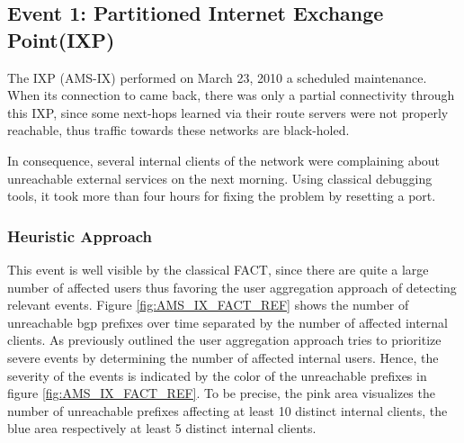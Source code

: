 \subsection{Event 1: Partitioned Internet Exchange Point(IXP)}

The IXP \citet{AMS-IX}(AMS-IX) performed on March 23, 2010 a scheduled maintenance. 
When its connection to \citet{switch} came back, there was only a partial connectivity through this IXP, since some next-hops learned via their route servers were not properly reachable, thus traffic towards these networks are black-holed\citep{SchatzmannPAM2011}.

In consequence, several internal clients of the \citet{switch} network were complaining about unreachable external services on the next morning. 
Using classical debugging tools, it took more than four hours for fixing the problem by resetting a port.\citep{SchatzmannPAM2011}

\subsubsection{Heuristic Approach} This event is well visible by the classical \gls{FACT}, since there are quite a large number of affected users thus favoring the user aggregation approach of detecting relevant events. 
Figure \ref{fig:AMS_IX_FACT_REF} shows the number of unreachable \gls{bgp} prefixes over time separated by the number of affected internal clients. 
As previously outlined the user aggregation approach tries to prioritize severe events by determining the number of affected internal users. 
Hence, the severity of the events is indicated by the color of the unreachable prefixes in figure \ref{fig:AMS_IX_FACT_REF}. 
To be precise, the pink area visualizes the number of unreachable prefixes affecting at least 10 distinct internal clients, the blue area respectively at least 5 distinct internal clients.

